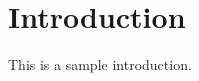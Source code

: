 \section{Introduction}%
\label{sec:Introduction}%
This is a sample introduction. 
\lipsum[1-2]
\linebreak